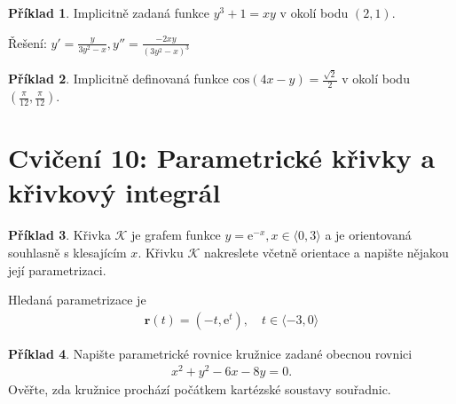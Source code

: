 \documentclass{article}
\theoremstyle{definition}
\newtheorem{exmp}{Příklad}[section]
\newcommand{\e}[1]{\mathrm{e}^{#1}}
\newcommand{\vect}[1]{\bm{#1}}
\newenvironment{colbox}[1]
  {\newcommand\colboxcolor{#1}%
   \begin{lrbox}{\selvestebox}%
   \begin{minipage}{\dimexpr\columnwidth-2\fboxsep\relax}}
  {\end{minipage}\end{lrbox}%
   \begin{center}
   \colorbox[HTML]{\colboxcolor}{\usebox{\selvestebox}}
   \end{center}}
\begin{document}
\begin{colbox}{DDDDDD}
\begin{exmp}
Implicitně zadaná funkce $y^3 + 1 = xy$ v okolí bodu $(2, 1)$.
\end{exmp}
\end{colbox}
Řešení: $y'=\frac{y}{3y^2-x}, y''=\frac{-2xy}{(3y^2-x)^3}$

\begin{colbox}{DDDDDD}
\begin{exmp}
Implicitně definovaná funkce $\text{cos}\left(4x-y\right)=\frac{\sqrt{2}}{2}$ v okolí bodu $\left(\frac{\pi}{12}, \frac{\pi}{12}\right)$.
\end{exmp}
\end{colbox}

\clearpage
\newpage
\section{Cvičení 10: Parametrické křivky a křivkový integrál}

\begin{colbox}{DDDDDD}
\begin{exmp}
    Křivka $\mathcal{K}$ je grafem funkce $y=\e{-x}, x\in \langle 0, 3\rangle$ a je orientovaná souhlasně s klesajícím $x$. Křivku $\mathcal{K}$ nakreslete včetně orientace a napište nějakou její parametrizaci.
\end{exmp}
\end{colbox}

Hledaná parametrizace je
\begin{align*}
    \vect{r}(t) = (-t, \e{t}),\quad t\in \langle -3, 0\rangle 
\end{align*}

\begin{colbox}{DDDDDD}
\begin{exmp}
    Napište parametrické rovnice kružnice zadané obecnou rovnici 
    \begin{align*}
        x^2 + y^2 -6x - 8y = 0.
    \end{align*}
    Ověřte, zda kružnice prochází počátkem kartézské soustavy souřadnic.
\end{exmp}
\end{colbox}
\end{document}
